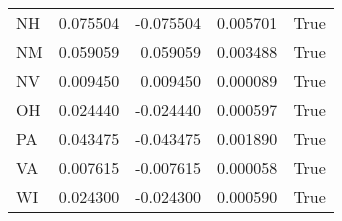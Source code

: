 \begin{table}
\begin{tabular}{lrrrl}
      NH &   0.075504 & -0.075504 &       0.005701 &          True \\
      NM &   0.059059 &  0.059059 &       0.003488 &          True \\
      NV &   0.009450 &  0.009450 &       0.000089 &          True \\
      OH &   0.024440 & -0.024440 &       0.000597 &          True \\
      PA &   0.043475 & -0.043475 &       0.001890 &          True \\
      VA &   0.007615 & -0.007615 &       0.000058 &          True \\
      WI &   0.024300 & -0.024300 &       0.000590 &          True \\
\bottomrule
\end{tabular}
\end{table}
